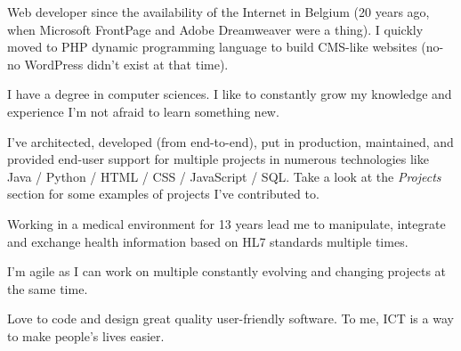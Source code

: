 

\begin{cvparagraph}

Web developer since the availability of the Internet in Belgium (20 years ago, when Microsoft FrontPage and Adobe Dreamweaver were a thing). I quickly moved to PHP dynamic programming language to build CMS-like websites (no-no WordPress didn't exist at that time).

I have a degree in computer sciences. I like to constantly grow my knowledge and experience \Rightarrow  I'm not afraid to learn something new. 

I've architected, developed (from end-to-end), put in production, maintained, and provided end-user support for multiple projects in numerous technologies like Java / Python / HTML / CSS / JavaScript / SQL. Take a look at the \emph{Projects} section for some examples of projects I've contributed to.

Working in a medical environment for 13 years lead me to manipulate, integrate and exchange health information based on HL7 standards multiple times.

I'm agile as I can work on multiple constantly evolving and changing projects at the same time.

Love to code and design great quality user-friendly software.
To me, ICT is a way to make people's lives easier.
\end{cvparagraph}
